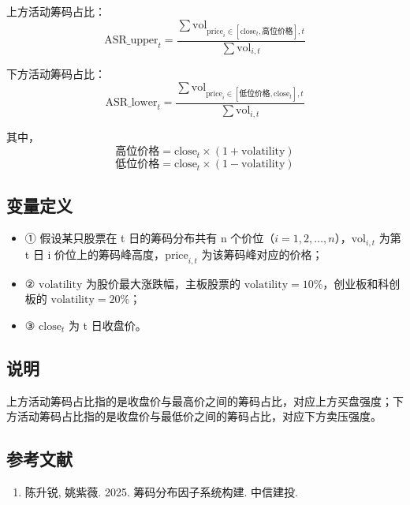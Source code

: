 \documentclass{article}
\begin{document}
上方活动筹码占比：
\begin{equation}
    \mathrm{ASR\_upper}_t = \frac{\sum \mathrm{vol}_{\mathrm{price}_{i} \in [\mathrm{close}_t, \text{高位价格}],t}}{\sum \mathrm{vol}_{i,t}}
\end{equation}

下方活动筹码占比：
\begin{equation}
    \mathrm{ASR\_lower}_t = \frac{\sum \mathrm{vol}_{\mathrm{price}_{i} \in [\text{低位价格},\mathrm{close}_t],t}}{\sum \mathrm{vol}_{i,t}}
\end{equation}

其中，
\begin{equation}
    \text{高位价格} = \mathrm{close}_t \times (1 + \mathrm{volatility})
\end{equation}
\begin{equation}
    \text{低位价格} = \mathrm{close}_t \times (1 - \mathrm{volatility})
\end{equation}

\subsection{变量定义}
\begin{itemize}
    \item ① 假设某只股票在 t 日的筹码分布共有 n 个价位（\( i = 1, 2, \ldots, n \)），\( \mathrm{vol}_{i,t} \) 为第 t 日 i 价位上的筹码峰高度，\( \mathrm{price}_{i,t} \) 为该筹码峰对应的价格；
    \item ② \( \mathrm{volatility} \) 为股价最大涨跌幅，主板股票的 \( \mathrm{volatility} = 10\% \)，创业板和科创板的 \( \mathrm{volatility} = 20\% \)；
    \item ③ \( \mathrm{close}_t \) 为 t 日收盘价。
\end{itemize}

\subsection{说明}
上方活动筹码占比指的是收盘价与最高价之间的筹码占比，对应上方买盘强度；下方活动筹码占比指的是收盘价与最低价之间的筹码占比，对应下方卖压强度。

\subsection{参考文献}
\begin{enumerate}
    \item 陈升锐, 姚紫薇. 2025. 筹码分布因子系统构建. 中信建投.
\end{enumerate}
\end{document}
